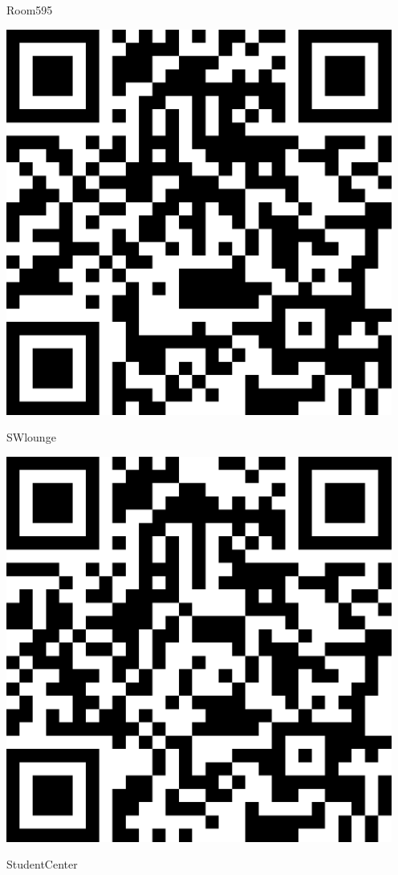 \documentclass[letterpaper]{article}
\begin{document}
 \hfill{\small Room595} 

 \vspace{1in} 
 \pagebreak 
{} 
 \vspace*{\fill} 
 \begingroup 
 \centerline{\includegraphics[scale=1,width=5in,height=5in]{SWlounge.png}} 
 \endgroup 
 \vspace*{\fill} 

 \hfill{\small SWlounge} 

 \vspace{1in} 
 \pagebreak 
{} 
 \vspace*{\fill} 
 \begingroup 
 \centerline{\includegraphics[scale=1,width=5in,height=5in]{StudentCenter.png}} 
 \endgroup 
 \vspace*{\fill} 

 \hfill{\small StudentCenter} 

 \vspace{1in} 
 \pagebreak 
\end{document}
